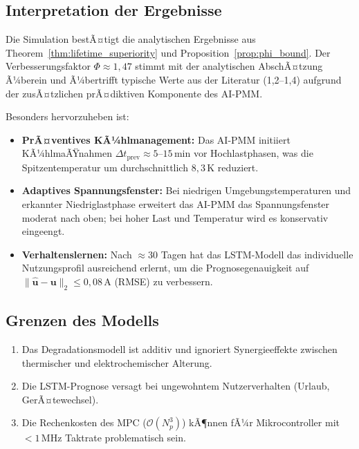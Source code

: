 ﻿\documentclass[12pt,a4paper]{article}
\begin{document}
	\subsection{Interpretation der Ergebnisse}
	
	Die Simulation bestÃ¤tigt die analytischen Ergebnisse aus Theorem~\ref{thm:lifetime_superiority}
	und Proposition~\ref{prop:phi_bound}. Der Verbesserungsfaktor $\Phi \approx 1{,}47$
	stimmt mit der analytischen AbschÃ¤tzung Ã¼berein und Ã¼bertrifft typische
	Werte aus der Literatur (1{,}2--1{,}4) aufgrund der zusÃ¤tzlichen prÃ¤diktiven
	Komponente des AI-PMM.
	
	Besonders hervorzuheben ist:
	
	\begin{itemize}
		\item \textbf{PrÃ¤ventives KÃ¼hlmanagement:} Das AI-PMM initiiert KÃ¼hlmaÃŸnahmen
		$\Delta t_\mathrm{prev} \approx 5\text{--}15\,\mathrm{min}$ vor
		Hochlastphasen, was die Spitzentemperatur um durchschnittlich $8{,}3\,\mathrm{K}$
		reduziert.
		
		\item \textbf{Adaptives Spannungsfenster:} Bei niedrigen Umgebungstemperaturen
		und erkannter Niedriglastphase erweitert das AI-PMM das Spannungsfenster
		moderat nach oben; bei hoher Last und Temperatur wird es konservativ eingeengt.
		
		\item \textbf{Verhaltenslernen:} Nach $\approx 30$ Tagen hat das LSTM-Modell
		das individuelle Nutzungsprofil ausreichend erlernt, um die Prognosegenauigkeit
		auf $\|\hat{\mathbf{u}} - \mathbf{u}\|_2 \leq 0{,}08\,\mathrm{A}$ (RMSE) zu
		verbessern.
	\end{itemize}
	
	\subsection{Grenzen des Modells}
	
	\begin{enumerate}[leftmargin=*, label=(\arabic*)]
		\item Das Degradationsmodell ist additiv und ignoriert Synergieeffekte
		zwischen thermischer und elektrochemischer Alterung.
		\item Die LSTM-Prognose versagt bei ungewohntem Nutzerverhalten
		(Urlaub, GerÃ¤tewechsel).
		\item Die Rechenkosten des MPC ($\mathcal{O}(N_p^3)$) kÃ¶nnen fÃ¼r
		Mikrocontroller mit $< 1\,\mathrm{MHz}$ Taktrate problematisch sein.
	\end{enumerate}
	
\end{document}
